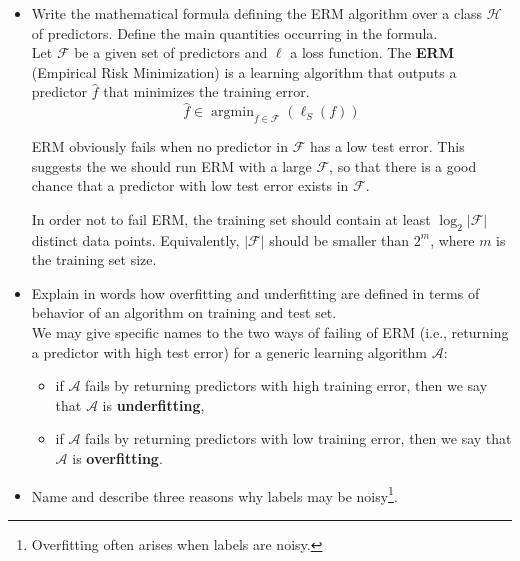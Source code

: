 \begin{itemize}
    \item Write the mathematical formula defining the ERM algorithm over a class $\mathcal{H}$ of predictors.
Define the main quantities occurring in the formula.\\
         
        Let $\mathcal{F}$ be a given set of predictors and $\ell$ a loss function.  
        The \textbf{ERM} (Empirical Risk Minimization) is a learning algorithm that outputs a predictor $\hat{f}$ that minimizes the training error.\\
        $$\hat{f} \in \mathop{argmin}_{f \in \mathcal{F}} \left( \ell_{S}(f) \right)$$

        ERM obviously fails when no predictor in $\mathcal{F}$  has a low test error.
        This suggests the we should run ERM with a large $\mathcal{F}$, so that there is a good chance that a predictor with low test error exists in $\mathcal{F}$.

        In order not to fail ERM, the training set should contain at least $\log_{2}|\mathcal{F}|$ distinct data points. Equivalently, $|\mathcal{F}|$ should be smaller than $2^{m}$, where $m$ is the training set size.\\

    \item Explain in words how overfitting and underfitting are defined in terms of behavior of an algorithm on training and test set.\\

        We may give specific names to the two ways of failing of ERM (i.e., returning a predictor with high test error) for a generic learning algorithm $\mathcal{A}$: 
            \begin{itemize}
                \item if $\mathcal{A}$ fails by returning predictors with high training error, then we say that $\mathcal{A}$ is \textbf{underfitting},
                \item  if $\mathcal{A}$ fails by returning predictors with low training error, then we say that $\mathcal{A}$ is \textbf{overfitting}.
            \end{itemize}
   
    \newpage
    \item  Name and describe three reasons why labels may be noisy\footnote{Overfitting often arises when labels are noisy.}.\\


\end{itemize}
